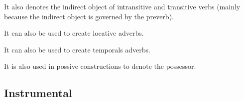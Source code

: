 \documentclass[a4paper, 10pt]{book}
\begin{document}
It also denotes the indirect object of intransitive and transitive verbs (mainly because the indirect object is governed by the preverb).

\begin{exe}
\ex
\begin{xlist}
    \ex {}
\end{xlist}
\end{exe}

\begin{exe}
\ex
\begin{xlist}
    \ex {}
\end{xlist}
\end{exe}

It can also be used to create locative adverbs.

\begin{exe}
\ex
\begin{xlist}
    \ex {}
    \ex {}
\end{xlist}
\end{exe}

It can also be used to create temporals adverbs.

\begin{exe}
\ex
\begin{xlist}
    \ex {}
\end{xlist}
\end{exe}

It is also used in possive constructions to denote the possessor.
\begin{exe}
\ex
\begin{xlist}
    \ex {}
\end{xlist}
\end{exe}


\subsection{Instrumental}
\end{document}

